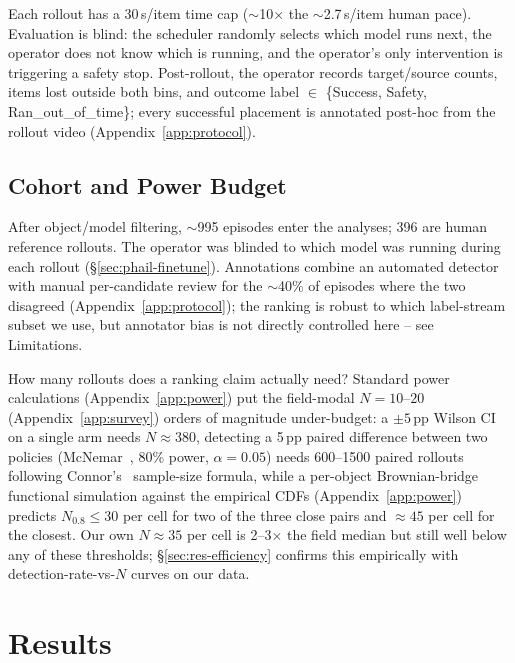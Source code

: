 \documentclass{article}
\begin{document}
Each rollout has a 30\,s/item time cap ($\sim$10$\times$ the $\sim$2.7\,s/item human pace). Evaluation is blind: the scheduler randomly selects which model runs next, the operator does not know which is running, and the operator's only intervention is triggering a safety stop. Post-rollout, the operator records target/source counts, items lost outside both bins, and outcome label $\in$ \{Success, Safety, Ran\_out\_of\_time\}; every successful placement is annotated post-hoc from the rollout video (Appendix~\ref{app:protocol}).

\subsection{Cohort and Power Budget}\label{sec:phail-cohort}

After object/model filtering, $\sim$995 episodes enter the analyses; 396 are human reference rollouts. The operator was blinded to which model was running during each rollout (\S\ref{sec:phail-finetune}). Annotations combine an automated detector with manual per-candidate review for the $\sim$40\% of episodes where the two disagreed (Appendix~\ref{app:protocol}); the ranking is robust to which label-stream subset we use, but annotator bias is not directly controlled here -- see Limitations.

How many rollouts does a ranking claim actually need? Standard power calculations (Appendix~\ref{app:power}) put the field-modal $N{=}10$--$20$ (Appendix~\ref{app:survey}) orders of magnitude under-budget: a $\pm 5$\,pp Wilson CI on a single arm needs $N{\approx}380$, detecting a 5\,pp paired difference between two policies (McNemar~\cite{mcnemar1947}, 80\% power, $\alpha{=}0.05$) needs 600--1500 paired rollouts following Connor's~\cite{connor1987} sample-size formula, while a per-object Brownian-bridge functional simulation against the empirical CDFs (Appendix~\ref{app:power}) predicts $N_{0.8} \le 30$ per cell for two of the three close pairs and $\approx 45$ per cell for the closest. Our own $N \approx 35$ per cell is 2--3$\times$ the field median but still well below any of these thresholds; \S\ref{sec:res-efficiency} confirms this empirically with detection-rate-vs-$N$ curves on our data.

\section{Results}\label{sec:results}
\end{document}
